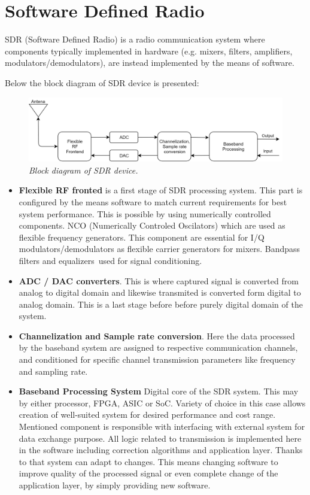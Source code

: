 \documentclass[en,printmode]{mgr}
\begin{document}
	\newpage
	\section{Software Defined Radio}
		SDR (Software Defined Radio) is a radio communication system where components typically
		 implemented in hardware 
		(e.g. mixers, filters, amplifiers, modulators/demodulators), are instead implemented
		 by the means of software.
		
		Below the block diagram of SDR device is presented:
		\begin{figure}[!htb]
    		\centering
   			\includegraphics[width=\textwidth]{diag/sdr.png}
    		\caption{\textit{Block diagram of SDR device.}}
		\end{figure}
		
		\begin{itemize}
			\item \textbf{Flexible RF fronted} is a first stage of SDR processing system. This part is configured by the means
			software to match current requirements for best system performance. This is possible by using numerically
			controlled components.
			NCO (Numerically Controled Oscilators) which are used as flexible frequency generators. This component are
			essential for I/Q modulators/demodulators as flexible carrier generators for mixers. Bandpass filters and equalizers\
			used for signal conditioning.
			
			\item \textbf{ADC / DAC converters}. This is where captured signal is converted from analog to digital domain and
			likewise transmited is converted form digital to analog domain. This is a last stage before before purely digital 
			domain of the system.
			
			\item \textbf{Channelization and Sample rate conversion}. Here the data processed by the baseband system are assigned
			to respective communication channels, and conditioned for specific channel transmission parameters like frequency and
			sampling rate.
			
			\item \textbf{Baseband Processing System} Digital core of the SDR system. This may by either processor, FPGA, ASIC or
			SoC. Variety of choice in this case allows creation of well-suited system for desired performance and cost range. 
			Mentioned component is responsible with interfacing with external system for data exchange purpose. All logic related to
			transmission is implemented here in the software including correction algorithms and application layer. Thanks to that
			system can adapt to changes. This means changing software to improve quality of the processed signal
			or even complete change of the application layer, by simply providing new software.
		\end{itemize}
		
\end{document}

